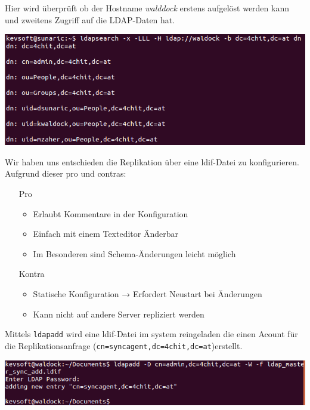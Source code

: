 Hier wird überprüft ob der Hostname \textit{walddock} erstens aufgelöst werden kann und zweitens Zugriff auf die LDAP-Daten hat.


\begin{center}
	\includegraphics[width=1.0\linewidth]{images/a6_testaccessfromslavetomaster.PNG}
\end{center}

Wir haben uns entschieden die Replikation über eine ldif-Datei zu konfigurieren.\\Aufgrund dieser pro und contras:
\begin{itemize}
	\item[Pro   ] 
	\begin{itemize}
		\item Erlaubt Kommentare in der Konfiguration
		\item Einfach mit einem Texteditor Änderbar
		\item Im Besonderen sind Schema-Änderungen 
		leicht möglich
	\end{itemize}
	\item[Kontra]
		\begin{itemize}
			\item Statische Konfiguration → Erfordert Neustart 
			bei Änderungen
			\item Kann nicht auf andere Server repliziert werden
		\end{itemize}
\end{itemize}
Mittels \verb|ldapadd| wird eine ldif-Datei im system reingeladen die einen Acount für die Replikationsanfrage (\verb|cn=syncagent,dc=4chit,dc=at|)erstellt.

\begin{center}
	\includegraphics[width=1.0\linewidth]{images/a7_add_sync_account.PNG}
\end{center}

